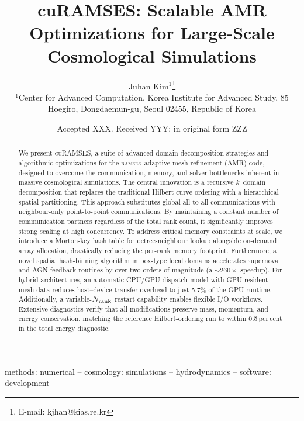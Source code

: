 \documentclass[fleqn,usenatbib]{mnras}
\title[cuRAMSES: Scalable AMR Optimizations for Cosmological Simulations]
{cuRAMSES: Scalable AMR Optimizations for Large-Scale Cosmological Simulations}
\author[J.~Kim]{
Juhan Kim$^{1}$\thanks{E-mail: kjhan@kias.re.kr}
\\
$^{1}$Center for Advanced Computation, Korea Institute for Advanced Study,
85 Hoegiro, Dongdaemun-gu, Seoul 02455, Republic of Korea
}
\date{Accepted XXX. Received YYY; in original form ZZZ}
\newcommand{\ramses}{\textsc{ramses}}
\newcommand{\curamses}{\textsc{cuRAMSES}}
\newcommand{\nrank}{N_{\rm rank}}
\newcommand{\ksec}{\ensuremath{k}\text{-section}}
\begin{document}

\label{firstpage}
\pagerange{\pageref{firstpage}--\pageref{lastpage}}

\maketitle

\begin{abstract}
We present \curamses, a suite of advanced domain decomposition strategies and 
algorithmic optimizations for the \ramses\ adaptive mesh refinement (AMR) code, 
designed to overcome the communication, memory, and solver bottlenecks inherent 
in massive cosmological simulations. 
The central innovation is a recursive \ksec\ domain decomposition that replaces the traditional Hilbert curve ordering with a hierarchical spatial partitioning. This approach substitutes global all-to-all communications with neighbour-only point-to-point communications. By maintaining a constant number of communication partners regardless of the total rank count, it significantly improves strong scaling at high concurrency. 
To address critical memory constraints at scale, we introduce a Morton-key hash 
table for octree-neighbour lookup alongside on-demand array allocation, drastically reducing the per-rank memory footprint. Furthermore, a novel spatial hash-binning algorithm in box-type local domains accelerates supernova and AGN feedback routines by over two orders of magnitude (a ${\sim}260\times$ speedup). 
For hybrid architectures, an automatic CPU/GPU dispatch model with GPU-resident 
mesh data reduces host--device transfer overhead to just 5.7\% of the GPU runtime. Additionally, a variable-$\nrank$ restart capability enables flexible I/O workflows. 
Extensive diagnostics verify that all modifications preserve mass, momentum, and
energy conservation, matching the reference Hilbert-ordering run to within
0.5\,per\,cent in the total energy diagnostic.
\end{abstract}

\begin{keywords}
methods: numerical -- cosmology: simulations -- hydrodynamics --
software: development
\end{keywords}

\end{document}
